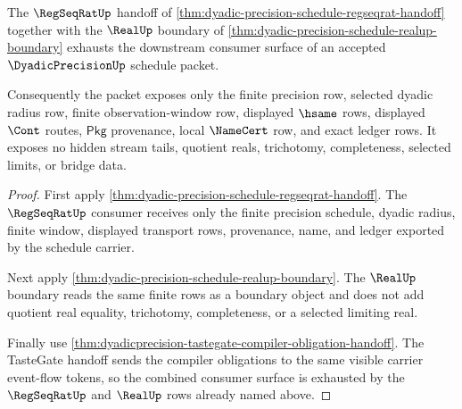 \begin{theorem}
\label{thm:dyadicprecision-regseqrat-realup-consumer-exhaustion}
The $\RegSeqRatUp$ handoff of
\autoref{thm:dyadic-precision-schedule-regseqrat-handoff} together with the
$\RealUp$ boundary of \autoref{thm:dyadic-precision-schedule-realup-boundary}
exhausts the downstream consumer surface of an accepted $\DyadicPrecisionUp$
schedule packet.

Consequently the packet exposes only the finite precision row, selected dyadic
radius row, finite observation-window row, displayed $\hsame$ rows, displayed
$\Cont$ routes, $\mathsf{Pkg}$ provenance, local $\NameCert$ row, and exact
ledger rows. It exposes no hidden stream tails, quotient reals, trichotomy,
completeness, selected limits, or bridge data.
\end{theorem}
\begin{proof}
First apply
\autoref{thm:dyadic-precision-schedule-regseqrat-handoff}. The $\RegSeqRatUp$
consumer receives only the finite precision schedule, dyadic radius, finite
window, displayed transport rows, provenance, name, and ledger exported by the
schedule carrier.

Next apply \autoref{thm:dyadic-precision-schedule-realup-boundary}. The
$\RealUp$ boundary reads the same finite rows as a boundary object and does not
add quotient real equality, trichotomy, completeness, or a selected limiting
real.

Finally use
\autoref{thm:dyadicprecision-tastegate-compiler-obligation-handoff}. The
TasteGate handoff sends the compiler obligations to the same visible carrier
event-flow tokens, so the combined consumer surface is exhausted by the
$\RegSeqRatUp$ and $\RealUp$ rows already named above.
\end{proof}

